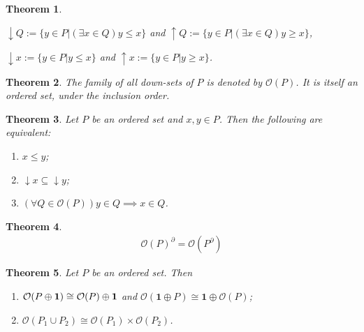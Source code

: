 \documentclass[a4paper,12pt,oneside]{report}%
\newtheorem{theorem}{Theorem}
\begin{document}
\begin{theorem}
    \begin{center}
    $\downarrow Q := \lbrace y \in P | ( \exists x \in Q ) y \leq x \rbrace$ and
    $\uparrow   Q := \lbrace y \in P | ( \exists x \in Q ) y \geq x \rbrace$,
    \end{center}

    \begin{center}
    $\downarrow x := \lbrace y \in P | y \leq x \rbrace$ and
    $\uparrow   x := \lbrace y \in P | y \geq x \rbrace$.
    \end{center}
\end{theorem}

\begin{theorem}
The family of all down-sets of $P$ is denoted by $\mathcal{O}(P)$. It is itself
    an ordered set, under the inclusion order.
\end{theorem}

\begin{theorem}
Let $P$ be an ordered set and $x,y \in P$. Then the following are equivalent:
    \begin{enumerate}
        \item $x \leq y$;
        \item $\downarrow x \subseteq \downarrow y$;
        \item $(\forall Q \in \mathcal{O}(P)) y \in Q \implies x \in Q$.
    \end{enumerate}
\end{theorem}

\begin{theorem}
    \begin{align*}
        \mathcal{O}(P)^{\partial} = \mathcal{O}(P^{\partial})
    \end{align*}
\end{theorem}

\begin{theorem}
Let $P$ be an ordered set. Then
    \begin{enumerate}
        \item $\mathcal{O}(P \oplus \textbf{1}) \cong \mathcal{O}(P) \oplus \textbf 1$
            and $\mathcal{O}(\textbf{1} \oplus P) \cong \textbf{1} \oplus \mathcal{O}(P)$;
        \item $\mathcal{O}(P_{1} \cup P_{2}) \cong \mathcal{O}(P_1) \times \mathcal{O}(P_{2})$.
    \end{enumerate}
\end{theorem}
\end{document}
